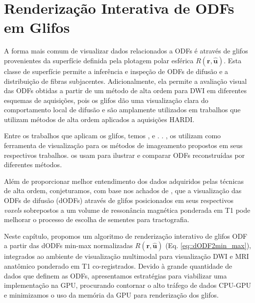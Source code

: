 \chapter{Renderização Interativa de \difusao ODFs em Glifos}
\label{chap::renderizacao_interativa_de_perfis_de_difusao}


A forma mais comum de visualizar dados relacionados a ODFs é através de glifos provenientes da superfície definida pela plotagem polar esférica $R(\mathbf{r} , \mathbf{\hat{u}})$. Esta classe de superfície permite a inferência e inspeção de ODFs de difusão e a distribuição de fibras subjacentes. Adicionalmente, ela permite a avaliação visual das ODFs obtidas a partir de um método de alta ordem para DWI em diferentes esquemas de aquisições, pois os glifos dão uma visualização clara do comportamento local de difusão e são amplamente utilizados em trabalhos que utilizam métodos de alta ordem aplicados a aquisições HARDI.

Entre os trabalhos que aplicam os glifos, temos ,   e  .  . ,   os utilizam como ferramenta de visualização para os métodos de imageamento propostos em seus respectivos trabalhos.  os usam para ilustrar e comparar ODFs reconstruídas por diferentes métodos.


Além de proporcionar melhor entendimento dos dados adquiridos pelas técnicas de alta ordem, conjeturamos, com base nos achados de , que a visualização das ODFs de difusão (dODFs) através de glifos posicionados em seus respectivos \textit{voxels} sobrepostos a um volume de ressonância magnética ponderada em T1 pode melhorar o processo de escolha de sementes para tractografia.

Neste capítulo, propomos um algoritmo de renderização 
interativo de glifos ODF a partir das dODFs min-max normalizadas $R(\mathbf{r}, \mathbf{\mathbf{\hat{u}}})$ (Eq. \ref{eq::dODF2min_max}), integrados ao ambiente de visualização multimodal para visualização DWI e MRI anatômico ponderado em T1 co-registrados. Devido à grande quantidade de dados que definem as ODFs, apresentamos estratégias para viabilizar uma implementação na GPU, procurando contornar o alto tráfego de dados CPU-GPU e minimizamos o uso da memória da GPU para renderização dos glifos.

